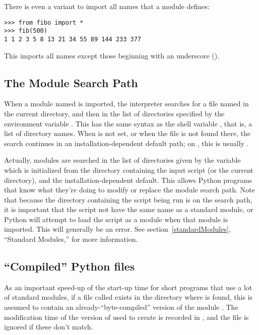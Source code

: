\documentclass{manual}
\begin{document}
There is even a variant to import all names that a module defines:

\begin{verbatim}
>>> from fibo import *
>>> fib(500)
1 1 2 3 5 8 13 21 34 55 89 144 233 377
\end{verbatim}

This imports all names except those beginning with an underscore
(\code{_}).


\subsection{The Module Search Path \label{searchPath}}

When a module named  is imported, the interpreter searches
for a file named  in the current directory,
and then in the list of directories specified by
the environment variable .  This has the same syntax as
the shell variable , that is, a list of
directory names.  When  is not set, or when the file
is not found there, the search continues in an installation-dependent
default path; on \UNIX, this is usually .

Actually, modules are searched in the list of directories given by the 
variable  which is initialized from the directory 
containing the input script (or the current directory),
 and the installation-dependent default.  This allows
Python programs that know what they're doing to modify or replace the 
module search path.  Note that because the directory containing the
script being run is on the search path, it is important that the
script not have the same name as a standard module, or Python will
attempt to load the script as a module when that module is imported.
This will generally be an error.  See section~\ref{standardModules},
``Standard Modules,'' for more information.


\subsection{``Compiled'' Python files}

As an important speed-up of the start-up time for short programs that
use a lot of standard modules, if a file called  exists
in the directory where  is found, this is assumed to
contain an already-``byte-compiled'' version of the module .
The modification time of the version of  used to create
 is recorded in , and the
 file is ignored if these don't match.
\end{document}

